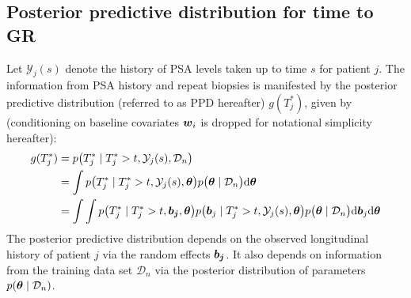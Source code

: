 
\subsection{Posterior predictive distribution for time to GR}
\label{subsec : ppd_time_to_GR}
Let $\mathcal{Y}_j(s)$ denote the history of PSA levels taken up to time $s$ for patient $j$. The information from PSA history and repeat biopsies is manifested by the posterior predictive distribution (referred to as PPD hereafter) $g(T^*_j)$, given by (conditioning on baseline covariates $\boldsymbol{w}_i$ is dropped for notational simplicity hereafter):
\begin{equation}
\label{eq : dyn_dist_fail_time}
\begin{split}
g(T^*_j) &= p\big(T^*_j \mid T^*_j > t, \mathcal{Y}_j(s), \mathcal{D}_n\big)\\
&= \int p\big(T^*_j \mid T^*_j > t, \mathcal{Y}_j(s), \bmath{\theta}\big) p\big(\bmath{\theta} \mid \mathcal{D}_n\big) \rmn{d} \bmath{\theta}\\
&= \int \int p\big(T^*_j \mid T^*_j > t, \bmath{b_j}, \bmath{\theta}\big) p\big(\bmath{b}_j \mid T^*_j>t, \mathcal{Y}_j(s), \bmath{\theta}\big)p\big(\bmath{\theta} \mid \mathcal{D}_n\big) \rmn{d} \bmath{b}_j \rmn{d} \bmath{\theta}
\end{split}
\end{equation}
The posterior predictive distribution depends on the observed longitudinal history of patient $j$ via the random effects $\boldsymbol{b_j}$. It also depends on information from the training data set $\mathcal{D}_n$ via the posterior distribution of parameters $p(\boldsymbol{\theta} \mid \mathcal{D}_n)$.